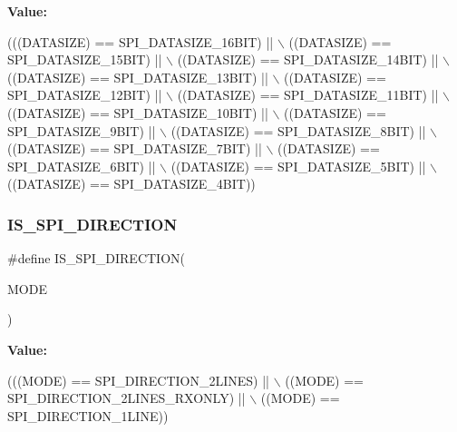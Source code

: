 {\bfseries Value\+:}
\begin{DoxyCode}
(((DATASIZE) == SPI\_DATASIZE\_16BIT) || \(\backslash\)
                                   ((DATASIZE) == SPI\_DATASIZE\_15BIT) || \(\backslash\)
                                   ((DATASIZE) == SPI\_DATASIZE\_14BIT) || \(\backslash\)
                                   ((DATASIZE) == SPI\_DATASIZE\_13BIT) || \(\backslash\)
                                   ((DATASIZE) == SPI\_DATASIZE\_12BIT) || \(\backslash\)
                                   ((DATASIZE) == SPI\_DATASIZE\_11BIT) || \(\backslash\)
                                   ((DATASIZE) == SPI\_DATASIZE\_10BIT) || \(\backslash\)
                                   ((DATASIZE) == SPI\_DATASIZE\_9BIT)  || \(\backslash\)
                                   ((DATASIZE) == SPI\_DATASIZE\_8BIT)  || \(\backslash\)
                                   ((DATASIZE) == SPI\_DATASIZE\_7BIT)  || \(\backslash\)
                                   ((DATASIZE) == SPI\_DATASIZE\_6BIT)  || \(\backslash\)
                                   ((DATASIZE) == SPI\_DATASIZE\_5BIT)  || \(\backslash\)
                                   ((DATASIZE) == SPI\_DATASIZE\_4BIT))
\end{DoxyCode}
\mbox{\label{group___s_p_i___private___macros_ga8ce4827db741ff965ea0cb1c105b00d5}} 
\subsubsection{\texorpdfstring{I\+S\+\_\+\+S\+P\+I\+\_\+\+D\+I\+R\+E\+C\+T\+I\+ON}{IS\_SPI\_DIRECTION}}
{\footnotesize\ttfamily \#define I\+S\+\_\+\+S\+P\+I\+\_\+\+D\+I\+R\+E\+C\+T\+I\+ON(\begin{DoxyParamCaption}\item[{}]{M\+O\+DE }\end{DoxyParamCaption})}

{\bfseries Value\+:}
\begin{DoxyCode}
(((MODE) == SPI\_DIRECTION\_2LINES)        || \(\backslash\)
                                ((MODE) == SPI\_DIRECTION\_2LINES\_RXONLY) || \(\backslash\)
                                ((MODE) == SPI\_DIRECTION\_1LINE))
\end{DoxyCode}
\mbox{\label{group___s_p_i___private___macros_ga29847ebb8b15a550b45705881641e7a4}} 

